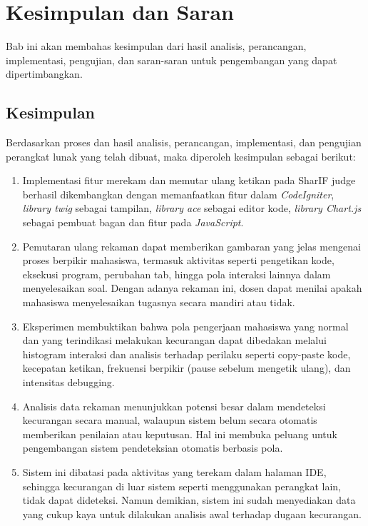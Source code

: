 \chapter{Kesimpulan dan Saran}
\label{chap:kesimpulandansaran}

Bab ini akan membahas kesimpulan dari hasil analisis, perancangan, implementasi, pengujian, dan saran-saran untuk pengembangan yang dapat dipertimbangkan.

\section{Kesimpulan}
Berdasarkan proses dan hasil analisis, perancangan, implementasi, dan pengujian perangkat lunak yang telah dibuat, maka diperoleh kesimpulan sebagai berikut:

\begin{enumerate}
	\item Implementasi fitur merekam dan memutar ulang ketikan pada SharIF judge berhasil dikembangkan dengan memanfaatkan fitur dalam \textit{CodeIgniter}, \textit{library twig} sebagai tampilan, \textit{library ace} sebagai editor kode, \textit{library Chart.js} sebagai pembuat bagan dan fitur pada \textit{JavaScript}.

	\item Pemutaran ulang rekaman dapat memberikan gambaran yang jelas mengenai proses berpikir mahasiswa, termasuk aktivitas seperti pengetikan kode, eksekusi program, perubahan tab, hingga pola interaksi lainnya dalam menyelesaikan soal. Dengan adanya rekaman ini, dosen dapat menilai apakah mahasiswa menyelesaikan tugasnya secara mandiri atau tidak.
	
	\item Eksperimen membuktikan bahwa pola pengerjaan mahasiswa yang normal dan yang terindikasi melakukan kecurangan dapat dibedakan melalui histogram interaksi dan analisis terhadap perilaku seperti copy-paste kode, kecepatan ketikan, frekuensi berpikir (pause sebelum mengetik ulang), dan intensitas debugging.

	\item Analisis data rekaman menunjukkan potensi besar dalam mendeteksi kecurangan secara manual, walaupun sistem belum secara otomatis memberikan penilaian atau keputusan. Hal ini membuka peluang untuk pengembangan sistem pendeteksian otomatis berbasis pola.
	
	\item Sistem ini dibatasi pada aktivitas yang terekam dalam halaman IDE, sehingga kecurangan di luar sistem seperti menggunakan perangkat lain, tidak dapat dideteksi. Namun demikian, sistem ini sudah menyediakan data yang cukup kaya untuk dilakukan analisis awal terhadap dugaan kecurangan.
\end{enumerate}

